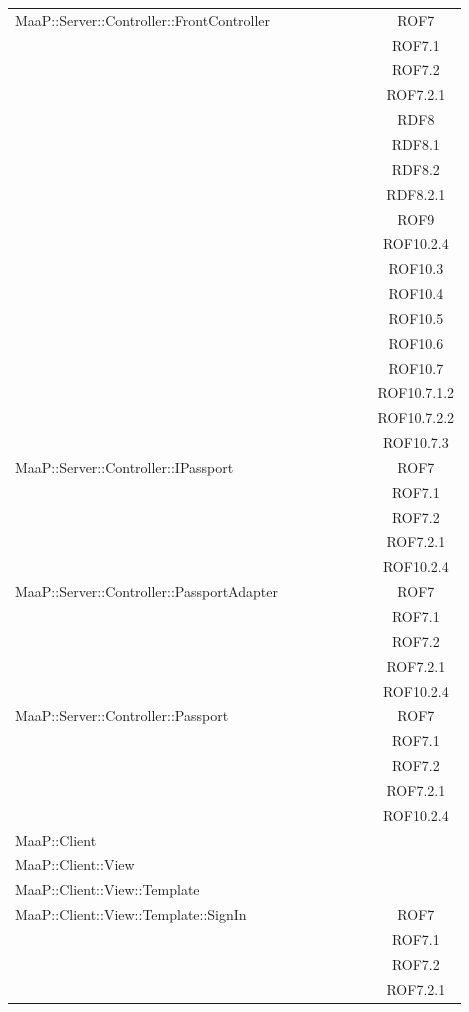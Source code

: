 \begin{center}
\begin{longtable}{|p{0.8\linewidth}|c|}
\midrule
MaaP::Server::Controller::FrontController
& ROF7\\
& ROF7.1\\
& ROF7.2\\
& ROF7.2.1\\
& RDF8\\
& RDF8.1\\
& RDF8.2\\
& RDF8.2.1\\
& ROF9\\
& ROF10.2.4\\
& ROF10.3\\
& ROF10.4\\
& ROF10.5\\
& ROF10.6\\
& ROF10.7\\
& ROF10.7.1.2\\
& ROF10.7.2.2\\
& ROF10.7.3\\

\midrule
MaaP::Server::Controller::IPassport
& ROF7\\
& ROF7.1\\
& ROF7.2\\
& ROF7.2.1\\
& ROF10.2.4\\

\midrule
MaaP::Server::Controller::PassportAdapter
& ROF7\\
& ROF7.1\\
& ROF7.2\\
& ROF7.2.1\\
& ROF10.2.4\\

\midrule
MaaP::Server::Controller::Passport
& ROF7\\
& ROF7.1\\
& ROF7.2\\
& ROF7.2.1\\
& ROF10.2.4\\

\midrule
MaaP::Client
& \\

\midrule
MaaP::Client::View
& \\

\midrule
MaaP::Client::View::Template
& \\

\midrule
MaaP::Client::View::Template::SignIn
& ROF7\\
& ROF7.1\\
& ROF7.2\\
& ROF7.2.1\\


\end{longtable}
\end{center}
